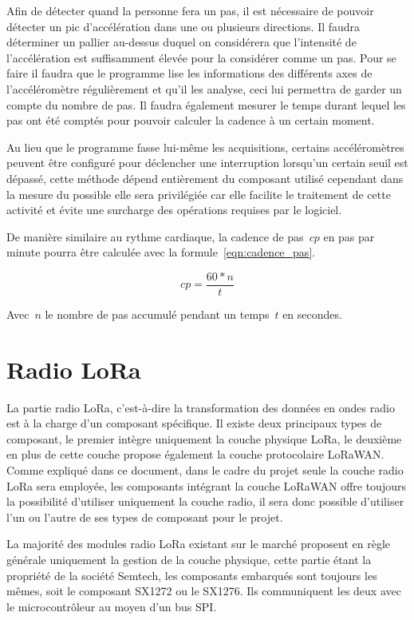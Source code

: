Afin de détecter quand la personne fera un pas, il est nécessaire de pouvoir détecter un pic d’accélération dans une ou plusieurs directions. Il faudra déterminer un pallier au-dessus duquel on considérera que l’intensité de l’accélération est suffisamment élevée pour la considérer comme un pas. Pour se faire il faudra que le programme lise les informations des différents axes de l’accéléromètre régulièrement et qu’il les analyse, ceci lui permettra de garder un compte du nombre de pas. Il faudra également mesurer le temps durant lequel les pas ont été comptés pour pouvoir calculer la cadence à un certain moment. 

Au lieu que le programme fasse lui-même les acquisitions, certains accéléromètres peuvent être configuré pour déclencher une interruption lorsqu’un certain seuil est dépassé, cette méthode dépend entièrement du composant utilisé cependant dans la mesure du possible elle sera privilégiée car elle facilite le traitement de cette activité et évite une surcharge des opérations requises par le logiciel.

De manière similaire au rythme cardiaque, la cadence de pas~$cp$ en pas par minute pourra être calculée avec la formule~\ref{eqn:cadence_pas}.

\begin{equation}\label{eqn:cadence_pas}
cp = \frac{60 * n}{t}
\end{equation}

Avec~$n$ le nombre de pas accumulé pendant un temps~$t$ en secondes.

\section{Radio LoRa}

La partie radio LoRa, c’est-à-dire la transformation des données en ondes radio est à la charge d’un composant spécifique. Il existe deux principaux types de composant, le premier intègre uniquement la couche physique LoRa, le deuxième en plus de cette couche propose également la couche protocolaire LoRaWAN. Comme expliqué dans ce document, dans le cadre du projet seule la couche radio LoRa sera employée, les composants intégrant la couche LoRaWAN offre toujours la possibilité d’utiliser uniquement la couche radio, il sera donc possible d’utiliser l’un ou l’autre de ses types de composant pour le projet.

La majorité des modules radio LoRa existant sur le marché proposent en règle générale uniquement la gestion de la couche physique, cette partie étant la propriété de la société Semtech, les composants embarqués sont toujours les mêmes, soit le composant SX1272 ou le SX1276. Ils communiquent les deux avec le microcontrôleur au moyen d’un bus SPI.

